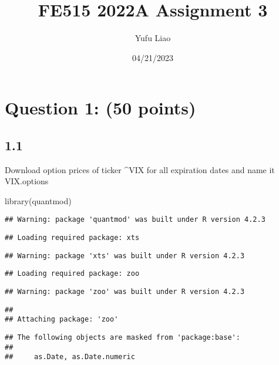 \documentclass[
]{article}
\title{FE515 2022A Assignment 3}
\author{Yufu Liao}
\date{04/21/2023}
\newenvironment{Shaded}{\begin{snugshade}}{\end{snugshade}}
\newcommand{\FunctionTok}[1]{\textcolor[rgb]{0.00,0.00,0.00}{#1}}
\newcommand{\NormalTok}[1]{#1}
\begin{document}
\maketitle

\hypertarget{question-1-50-points}{%
\section{Question 1: (50 points)}\label{question-1-50-points}}

\hypertarget{section}{%
\subsection{1.1}\label{section}}

Download option prices of ticker \^{}VIX for all expiration dates and
name it VIX.options

\begin{Shaded}
\begin{Highlighting}[]
\FunctionTok{library}\NormalTok{(quantmod)}
\end{Highlighting}
\end{Shaded}

\begin{verbatim}
## Warning: package 'quantmod' was built under R version 4.2.3
\end{verbatim}

\begin{verbatim}
## Loading required package: xts
\end{verbatim}

\begin{verbatim}
## Warning: package 'xts' was built under R version 4.2.3
\end{verbatim}

\begin{verbatim}
## Loading required package: zoo
\end{verbatim}

\begin{verbatim}
## Warning: package 'zoo' was built under R version 4.2.3
\end{verbatim}

\begin{verbatim}
## 
## Attaching package: 'zoo'
\end{verbatim}

\begin{verbatim}
## The following objects are masked from 'package:base':
## 
##     as.Date, as.Date.numeric
\end{verbatim}
\end{document}
